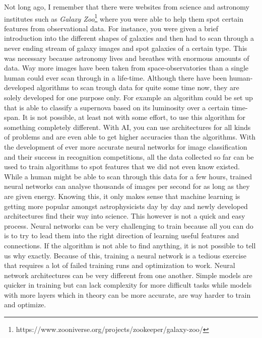 Not long ago, I remember that there were websites from science and astronomy institutes such as \textit{Galaxy Zoo}\footnote{https://www.zooniverse.org/projects/zookeeper/galaxy-zoo/} where you were able to help them spot certain features from observational data. For instance, you were given a brief introduction into the different shapes of galaxies and then had to scan through a never ending stream of galaxy images and spot galaxies of a certain type. This was necessary because astronomy lives and breathes with enormous amounts of data. Way more images have been taken from space-observatories than a single human could ever scan through in a life-time. Although there have been human-developed algorithms to scan trough data for quite some time now, they are solely developed for one purpose only. For example an algorithm could be set up that is able to classify a supernova based on its luminosity over a certain time-span. It is not possible, at least not with some effort, to use this algorithm for something completely different. With AI, you can use architectures for all kinds of problems and are even able to get higher accuracies than the algorithms. With the development of ever more accurate neural networks for image classification and their success in recognition competitions, all the data collected so far can be used to train algorithms to spot features that we did not even know existed. While a human might be able to scan through this data for a few hours, trained neural networks can analyse thousands of images per second for as long as they are given energy. Knowing this, it only makes sense that machine learning is getting more popular amongst astrophysicists day by day and newly developed architectures find their way into science. This however is not a quick and easy process. Neural networks can be very challenging to train because all you can do is to try to lead them into the right direction of learning useful features and connections. If the algorithm is not able to find anything, it is not possible to tell us why exactly. Because of this, training a neural network is a tedious exercise that requires a lot of failed training runs and optimization to work. Neural network architectures can be very different from one another. Simple models are quicker in training but can lack complexity for more difficult tasks while models with more layers which in theory can be more accurate, are way harder to train and optimize. \\

